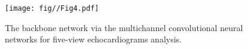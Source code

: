 




\begin{figure}[t]
\begin{center}
\texttt{[image: fig//Fig4.pdf]}
\end{center} 
\caption{The backbone network via the multichannel convolutional neural networks for five-view echocardiograms analysis.}
\label{fig:4}
\end{figure}


